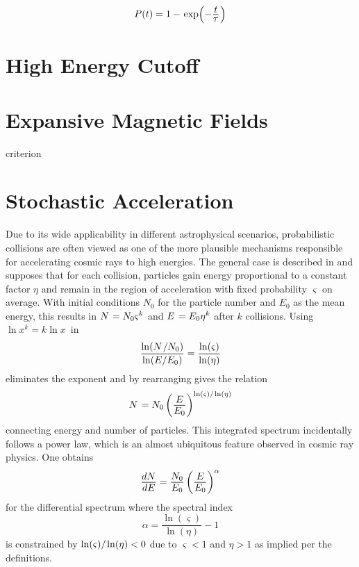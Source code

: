 \begin{equation*}
	P(t) = 1 - \kern+1.0pt \exp \Bigl( -\frac{\raisebox{-0.5ex}{$t$}}{\raisebox{0.5ex}{$\tau$}} \kern+0.5pt \Bigr)
\end{equation*}



\section{High Energy Cutoff}
\label{sec:cutoff}

 \cite{Gaisser_2016}



\section{Expansive Magnetic Fields}
\label{sec:fields}

\cite{Hillas_1984} criterion



\section{Stochastic Acceleration}
\label{sec:stochastic}

Due to its wide applicability in different astrophysical scenarios, probabilistic collisions are often viewed as one of
the more plausible mechanisms responsible for accelerating cosmic rays to high energies. The general case is described in
\cite{Longair_2011} and supposes that for each collision, particles gain energy proportional to a constant factor $\eta$ and
remain in the region of acceleration with fixed probability $\varsigma$ on average. With initial conditions $N_0$ for the
particle number and $E_0$ as the mean energy, this results in $N \kern+0.9pt = N_0 \varsigma^k$ and $E \kern+0.9pt = E_0 \eta^k$
after $k$ collisions. Using $\ln x^k = k\ln x$~in
\begin{equation*}
	\frac{\ln (N \kern+1.0pt / N_0)}{\ln (E / E_0)} = \frac{\ln(\varsigma)}{\ln(\eta)}
\end{equation*}
eliminates the exponent and by rearranging gives the relation
\begin{equation*}
	N \kern+0.9pt = N_0 \left( \frac{\raisebox{-0.3ex}{$E$}}{\raisebox{0.3ex}{$E_0$}} \right)^{\ln(\varsigma) / \kern-0.5pt \ln(\eta)}
\end{equation*}
connecting energy and number of particles. This integrated spectrum incidentally follows a power law, which is an almost
ubiquitous feature observed in cosmic ray physics. One obtains
\begin{equation*}
	\frac{\raisebox{-0.3ex}{$dN$}}{\raisebox{0.3ex}{$dE$}} = \frac{\raisebox{-0.3ex}{$N_0$}}{\raisebox{0.3ex}{$E_0$}}
	\left( \frac{\raisebox{-0.3ex}{$E$}}{\raisebox{0.3ex}{$E_0$}} \right)^\alpha
\end{equation*}
for the differential spectrum where the spectral index
\begin{equation*}
	\alpha = \frac{\ln(\varsigma)}{\ln(\eta)} - 1
\end{equation*}
is constrained by $\ln(\varsigma) / \kern-0.5pt \ln(\eta) < 0$ due to $\varsigma < 1$ and $\eta > 1$ as implied per the definitions.

